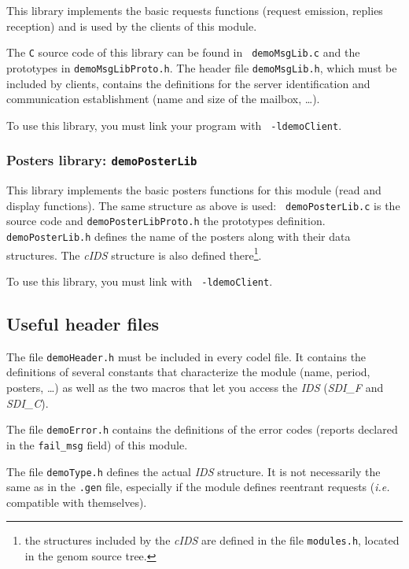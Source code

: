 This library implements  the basic requests  functions (request emission,
replies reception) and is used by the clients of this module.

The {\tt   C}  source code    of  this  library  can be   found  in  {\tt
demoMsgLib.c} and the  prototypes in {\tt demoMsgLibProto.h}.  The header
file {\tt demoMsgLib.h}, which must  be included by clients, contains the
definitions for the server identification and communication establishment
(name and size of the mailbox, \ldots).

To use this  library, you must link your  program with  {\tt
-ldemoClient}. 


\subsubsection{Posters library: {\tt demoPosterLib}}

This library implements the basic posters functions for this module (read
and display   functions).  The same    structure as above  is used:  {\tt
demoPosterLib.c} is  the  source code and  {\tt demoPosterLibProto.h} the
prototypes definition.  {\tt demoPosterLib.h}   defines the name  of  the
posters along  with  their data structures.  The  {\em cIDS} structure is
also defined there\footnote{the structures included by the {\em cIDS} are
defined in the file {\tt modules.h}, located in the genom source tree.}.

To  use this library,  you must link  with  {\tt 
-ldemoClient}.


\subsection{Useful header files}

The file {\tt  demoHeader.h} must  be included  in every  codel file.  It
contains the definitions of several constants that characterize the module
(name, period, posters, \ldots)  as well as the two  macros that let  you
access the {\em IDS} ({\em SDI\_F} and {\em SDI\_C}).

The file  {\tt demoError.h} contains the  definitions of the  error codes
(reports declared in the {\tt fail\_msg} field) of this module.

The file {\tt  demoType.h} defines the actual {\em  IDS} structure. It is
not necessarily the same as  in the  {\tt .gen}  file, especially if  the
module   defines   reentrant   requests   ({\em  i.e.}   compatible  with
themselves).

